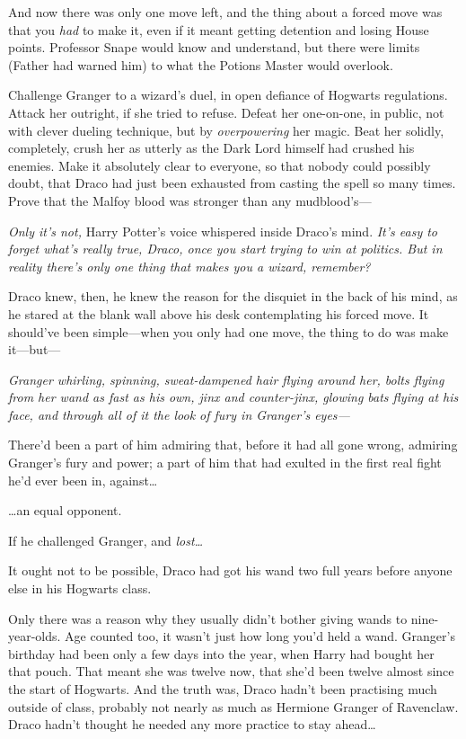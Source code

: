 And now there was only one move left, and the thing about a forced move was
that you \emph{had} to make it, even if it meant getting detention and losing
House points. Professor Snape would know and understand, but there were limits
(Father had warned him) to what the Potions Master would overlook.

Challenge Granger to a wizard’s duel, in open defiance of Hogwarts regulations.
Attack her outright, if she tried to refuse. Defeat her one-on-one, in public,
not with clever dueling technique, but by \emph{overpowering} her magic. Beat
her solidly, completely, crush her as utterly as the Dark Lord himself had
crushed his enemies. Make it absolutely clear to everyone, so that nobody could
possibly doubt, that Draco had just been exhausted from casting the spell so
many times. Prove that the Malfoy blood was stronger than any mudblood’s—

\emph{Only it’s not,} Harry Potter’s voice whispered inside Draco’s mind.
\emph{It’s easy to forget what’s really true, Draco, once you start trying to
win at politics. But in reality there’s only one thing that makes you a wizard,
remember?}

Draco knew, then, he knew the reason for the disquiet in the back of his mind,
as he stared at the blank wall above his desk contemplating his forced move. It
should’ve been simple—when you only had one move, the thing to do was make
it—but—

\emph{Granger whirling, spinning, sweat-dampened hair flying around her, bolts
flying from her wand as fast as his own, jinx and counter-jinx, glowing bats
flying at his face, and through all of it the look of fury in Granger’s eyes—}

There’d been a part of him admiring that, before it had all gone wrong,
admiring Granger’s fury and power; a part of him that had exulted in the first
real fight he’d ever been in, against…

…an equal opponent.

If he challenged Granger, and \emph{lost…}

It ought not to be possible, Draco had got his wand two full years before
anyone else in his Hogwarts class.

Only there was a reason why they usually didn’t bother giving wands to
nine-year-olds. Age counted too, it wasn’t just how long you’d held a wand.
Granger’s birthday had been only a few days into the year, when Harry had
bought her that pouch. That meant she was twelve now, that she’d been twelve
almost since the start of Hogwarts. And the truth was, Draco hadn’t been
practising much outside of class, probably not nearly as much as Hermione
Granger of Ravenclaw. Draco hadn’t thought he needed any more practice to stay
ahead…

